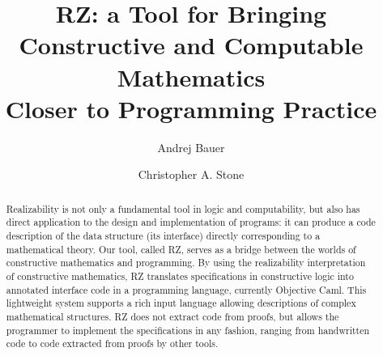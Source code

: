 \documentclass{llncs}
\newif\iflong
\begin{document}
\title{RZ: a Tool for Bringing\\
  Constructive and Computable Mathematics\\
  Closer to Programming Practice}
\author{
  Andrej Bauer \and
  Christopher A. Stone}

\maketitle

\begin{abstract}
  Realizability is not only a fundamental tool in logic
  and computability, but also has direct application to the design and
  implementation of programs: it can produce a code description of the data
  structure (its interface) directly corresponding to a
  mathematical theory.
%
  Our tool, called RZ,
  serves as a bridge between the worlds of constructive
  mathematics and programming. By using the realizability
  interpretation of constructive mathematics, RZ 
  translates specifications in constructive logic into annotated
  interface code in a programming language, currently Objective Caml.
%
  This lightweight system supports
  a rich input language allowing descriptions of
  complex mathematical structures. RZ does not extract code from
  proofs, but allows the programmer to implement the specifications in
  any fashion, ranging from handwritten code to code extracted from
  proofs by other tools.
\end{abstract}













\iflong
\appendix

\fi %
\end{document}

